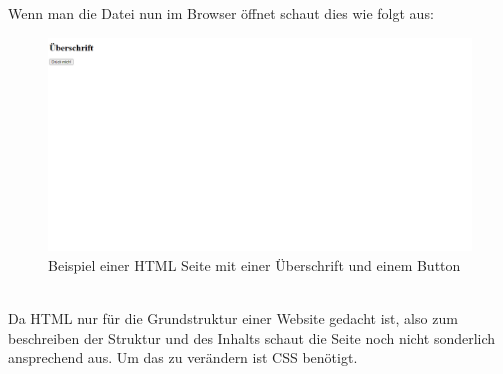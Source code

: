 		Wenn man die Datei nun im Browser öffnet schaut dies wie folgt aus:
		\begin{figure}[H]
			\centering
			\includegraphics[width=1\linewidth]{images/html1}
			\caption[HTML Beispielseite]{Beispiel einer HTML Seite mit einer Überschrift und einem Button}
			\label{fig:htmlbsp}
		\end{figure}
		~\\
		Da HTML nur für die Grundstruktur einer Website gedacht ist, also zum beschreiben der Struktur und des Inhalts schaut die Seite noch nicht sonderlich ansprechend aus. Um das zu verändern ist CSS benötigt.
		\cite{auszeichnungssprachen}
		\cite{html5-css3-handbuch}
		\cite{html5-css3-def}
